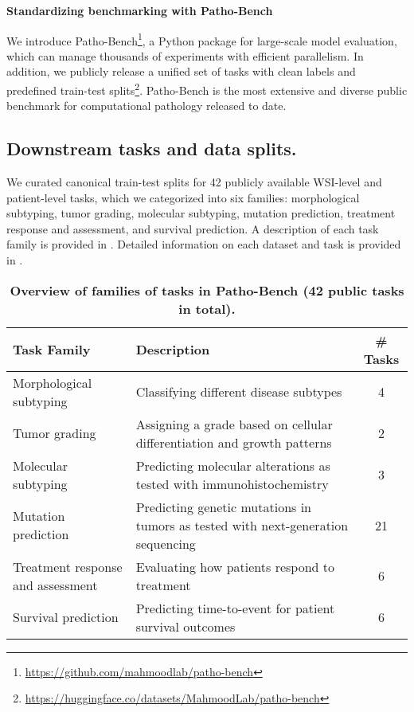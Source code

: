 \clearpage
\noindent\textbf{\large{Standardizing benchmarking with Patho-Bench}} \label{sec5}

We introduce Patho-Bench\footnote{\url{https://github.com/mahmoodlab/patho-bench}}, a Python package for large-scale model evaluation, which can manage thousands of experiments with efficient parallelism. In addition, we publicly release a unified set of tasks with clean labels and predefined train-test splits\footnote{\url{https://huggingface.co/datasets/MahmoodLab/patho-bench}}. Patho-Bench is the most extensive and diverse public benchmark for computational pathology released to date.

\subsection{Downstream tasks and data splits.}
We curated canonical train-test splits for 42 publicly available WSI-level and patient-level tasks, which we categorized into six families: morphological subtyping, tumor grading, molecular subtyping, mutation prediction, treatment response and assessment, and survival prediction. A description of each task family is provided in . Detailed information on each dataset and task is provided in \cite{vaidya2024amolecular}.

\begin{table}[ht]
    \centering
    \caption{\textbf{Overview of families of tasks in Patho-Bench (42 public tasks in total).}}
    \renewcommand{\arraystretch}{1.2}
    \begin{tabularx}{\textwidth}{lXc}
        \toprule
        \textbf{Task Family} & \textbf{Description} & \textbf{\# Tasks} \\
        \midrule
        Morphological subtyping & Classifying different disease subtypes & 4 \\
        Tumor grading & Assigning a grade based on cellular differentiation and growth patterns & 2 \\
        Molecular subtyping & Predicting molecular alterations as tested with immunohistochemistry & 3 \\
        Mutation prediction & Predicting genetic mutations in tumors as tested with next-generation sequencing & 21 \\
        Treatment response and assessment & Evaluating how patients respond to treatment & 6 \\
        Survival prediction & Predicting time-to-event for patient survival outcomes & 6 \\
        \bottomrule
    \end{tabularx}
    \label{tab:tasks}
\end{table}

